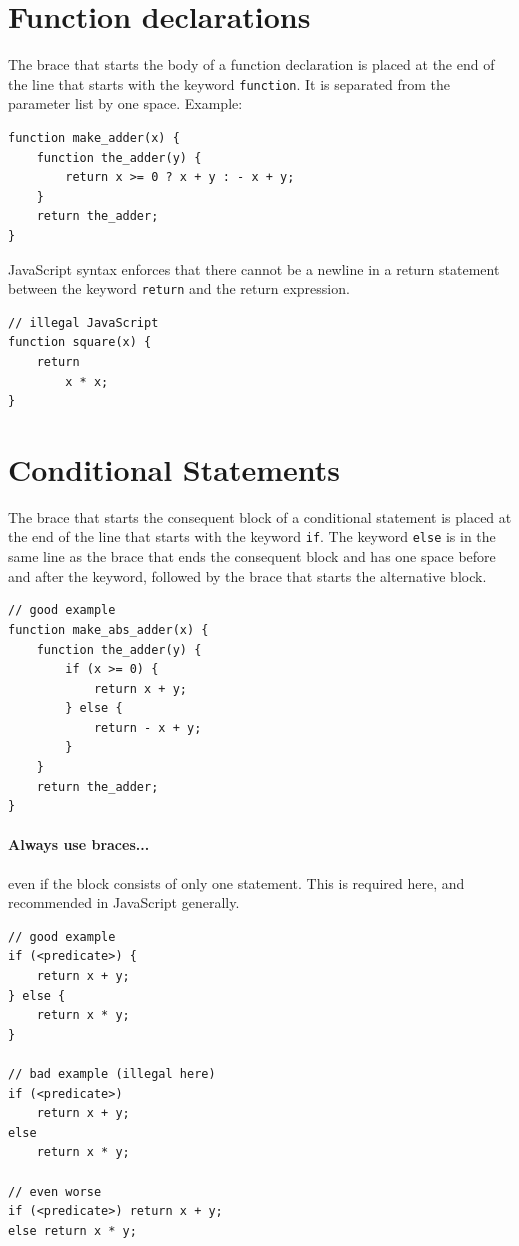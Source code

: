 \section*{Function declarations}

The brace that starts the body of a function declaration is placed at the end of the line that
starts with the keyword \lstinline{function}. It is separated from the parameter list by one
space.
Example:
\begin{lstlisting}
function make_adder(x) {
    function the_adder(y) {
        return x >= 0 ? x + y : - x + y;
    }
    return the_adder;
}
\end{lstlisting}
%
JavaScript syntax enforces that there cannot be a newline in a return statement
between the keyword \lstinline{return} and the return expression.

\begin{lstlisting}
// illegal JavaScript
function square(x) {
    return
        x * x;
}
\end{lstlisting}

\section*{Conditional Statements}

The brace that starts the consequent block of a conditional statement
is placed at the end of the line that starts with the keyword \lstinline{if}.
The keyword \lstinline{else} is in the same line as the brace that ends the
consequent block and has one space before and after the keyword, followed by
the brace that starts the alternative block.
%
\begin{lstlisting}
// good example
function make_abs_adder(x) {
    function the_adder(y) {
        if (x >= 0) {
            return x + y;
        } else {
            return - x + y;
        }
    }
    return the_adder;
}
\end{lstlisting}

\paragraph{Always use braces...} even if the block consists of only 
  one statement. This is required here, and recommended in JavaScript generally.

\begin{lstlisting}
// good example
if (<predicate>) {
    return x + y;
} else {
    return x * y;
}

// bad example (illegal here)
if (<predicate>) 
    return x + y;
else 
    return x * y;

// even worse
if (<predicate>) return x + y;
else return x * y;
\end{lstlisting}

